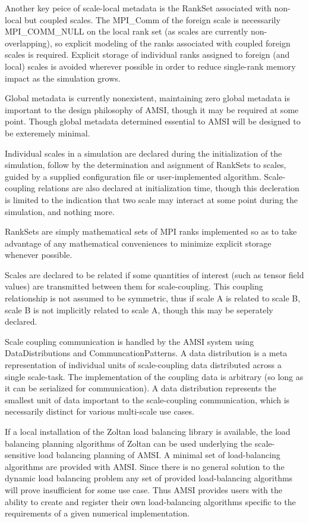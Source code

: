 \documentclass[11pt]{article}
\begin{document}
Another key peice of scale-local metadata is the RankSet associated with non-local but coupled scales. The MPI_Comm of the foreign scale is necessarily MPI_COMM_NULL on the local rank set (as scales are currently non-overlapping), so explicit modeling of the ranks associated with coupled foreign scales is required.  Explicit storage of individual ranks assigned to foreign (and local) scales is avoided wherever possible in order to reduce single-rank memory impact as the simulation grows. 

Global metadata is currently nonexistent, maintaining zero global metadata is important to the design philosophy of AMSI, though it may be required at some point. Though global metadata determined essential to AMSI will be designed to be exteremely minimal.

\label{amsi_scales}
Individual scales in a simulation are declared during the initialization of the simulation, follow by the determination and asignment of RankSets to scales, guided by a supplied configuration file or user-implemented algorithm. Scale-coupling relations are also declared at initialization time, though this decleration is limited to the indication that two scale may interact at some point during the simulation, and nothing more.

RankSets are simply mathematical sets of MPI ranks implemented so as to take advantage of any mathematical conveniences to minimize explicit storage whenever possible.

Scales are declared to be related if some quantities of interest (such as tensor field values) are transmitted between them for scale-coupling. This coupling relationship is not assumed to be symmetric, thus if scale A is related to scale B, scale B is not implicitly related to scale A, though this may be seperately declared.

\label{amsi_communication}
Scale coupling communication is handled by the AMSI system using DataDistributions and CommuncationPatterns. A data distribution is a meta representation of individual units of scale-coupling data distributed across a single scale-task. The implementation of the coupling data is arbitrary (so long as it can be serialized for communication). A data distribution represents the smallest unit of data important to the scale-coupling communication, which is necessarily distinct for various multi-scale use cases.

\label{amsi_data_migration_balancing}
If a local installation of the Zoltan \cite{ZoltanOverviewArticle2002} \cite{ZoltanIsorropiaOverview2012} load balancing library is available, the load balancing planning algorithms of Zoltan can be used underlying the scale-sensitive load balancing planning of AMSI. A minimal set of load-balancing algorithms are provided with AMSI. Since there is no general solution to the dynamic load balancing problem any set of provided load-balancing algorithms will prove insufficient for some use case. Thus AMSI provides users with the ability to create and register their own load-balancing algorithms specific to the requirements of a given numerical implementation.
\end{document}
